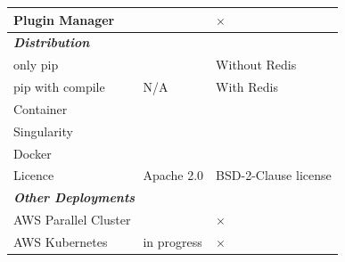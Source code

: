 \documentclass[sigconf]{acmart}
\newcommand{\YES}{\ding{51}}
\newcommand{\NO}{$\times$}
\begin{document}
\begin{table}[htbp]
{\begin{tabular}{|l|l|l|}
\hline
Plugin Manager & \YES & \NO \\
\hline
\multicolumn{3}{|l|}{\bf\em Distribution}\\
\hline
only pip & \YES & Without Redis \\
pip with compile & N/A & With Redis \\
Container & \YES & \YES \\
Singularity & \YES & \YES \\
Docker & \YES & \YES \\
Licence  & Apache 2.0 & BSD-2-Clause license \\
\hline
\multicolumn{3}{|l|}{\bf\em Other Deployments}\\
\hline
AWS Parallel Cluster & \YES & \NO \\ 
AWS Kubernetes  & in progress & \NO \\
\hline
\end{tabular}
}
\end{table}
\end{document}

